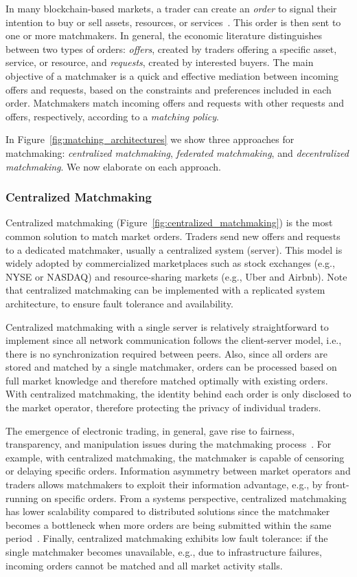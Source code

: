 In many blockchain-based markets, a trader can create an \emph{order} to signal their intention to buy or sell assets, resources, or services~\cite{veit2003matchmaking}.
This order is then sent to one or more matchmakers.
In general, the economic literature distinguishes between two types of orders: \emph{offers}, created by traders offering a specific asset, service, or resource, and \emph{requests}, created by interested buyers.
The main objective of a matchmaker is a quick and effective mediation between incoming offers and requests, based on the constraints and preferences included in each order.
Matchmakers match incoming offers and requests with other requests and offers, respectively, according to a \emph{matching policy}.

In Figure~\ref{fig:matching_architectures} we show three approaches for matchmaking: \emph{centralized matchmaking}, \emph{federated matchmaking}, and \emph{decentralized matchmaking}.
We now elaborate on each approach.

\subsubsection{Centralized Matchmaking}
Centralized matchmaking (Figure~\ref{fig:centralized_matchmaking}) is the most common solution to match market orders.
Traders send new offers and requests to a dedicated matchmaker, usually a centralized system (server).
This model is widely adopted by commercialized marketplaces such as stock exchanges (e.g., NYSE or NASDAQ) and resource-sharing markets (e.g., Uber and Airbnb).
Note that centralized matchmaking can be implemented with a replicated system architecture, to ensure fault tolerance and availability.

Centralized matchmaking with a single server is relatively straightforward to implement since all network communication follows the client-server model, i.e., there is no synchronization required between peers.
Also, since all orders are stored and matched by a single matchmaker, orders can be processed based on full market knowledge and therefore matched optimally with existing orders.
With centralized matchmaking, the identity behind each order is only disclosed to the market operator, therefore protecting the privacy of individual traders.

The emergence of electronic trading, in general, gave rise to fairness, transparency, and manipulation issues during the matchmaking process~\cite{mavroudis2019libra}.
For example, with centralized matchmaking, the matchmaker is capable of censoring or delaying specific orders.
Information asymmetry between market operators and traders allows matchmakers to exploit their information advantage, e.g., by front-running on specific orders.
From a systems perspective, centralized matchmaking has lower scalability compared to distributed solutions since the matchmaker becomes a bottleneck when more orders are being submitted within the same period~\cite{sigdel2005centralized}.
Finally, centralized matchmaking exhibits low fault tolerance: if the single matchmaker becomes unavailable, e.g., due to infrastructure failures, incoming orders cannot be matched and all market activity stalls.

